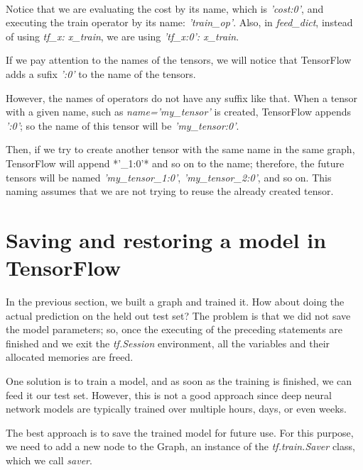\documentclass[11pt]{article}
\begin{document}
    \begin{center}
    \end{center}
    { \hspace*{\fill} \\}
    
    Notice that we are evaluating the cost by its name, which is
\emph{'cost:0'}, and executing the train operator by its name:
\emph{'train\_op'}. Also, in \emph{feed\_dict}, instead of using
\emph{tf\_x: x\_train}, we are using \emph{'tf\_x:0': x\_train}.

If we pay attention to the names of the tensors, we will notice that
TensorFlow adds a sufix \emph{':0'} to the name of the tensors.

However, the names of operators do not have any suffix like that. When a
tensor with a given name, such as \emph{name='my\_tensor'} is created,
TensorFlow appends \emph{':0'}; so the name of this tensor will be
\emph{'my\_tensor:0'}.

Then, if we try to create another tensor with the same name in the same
graph, TensorFlow will append *'\_1:0'* and so on to the name;
therefore, the future tensors will be named \emph{'my\_tensor\_1:0'},
\emph{'my\_tensor\_2:0'}, and so on. This naming assumes that we are not
trying to reuse the already created tensor.

    \section{Saving and restoring a model in
TensorFlow}\label{saving-and-restoring-a-model-in-tensorflow}

    In the previous section, we built a graph and trained it. How about
doing the actual prediction on the held out test set? The problem is
that we did not save the model parameters; so, once the executing of the
preceding statements are finished and we exit the \emph{tf.Session}
environment, all the variables and their allocated memories are freed.

One solution is to train a model, and as soon as the training is
finished, we can feed it our test set. However, this is not a good
approach since deep neural network models are typically trained over
multiple hours, days, or even weeks.

The best approach is to save the trained model for future use. For this
purpose, we need to add a new node to the Graph, an instance of the
\emph{tf.train.Saver} class, which we call \emph{saver}.
\end{document}
